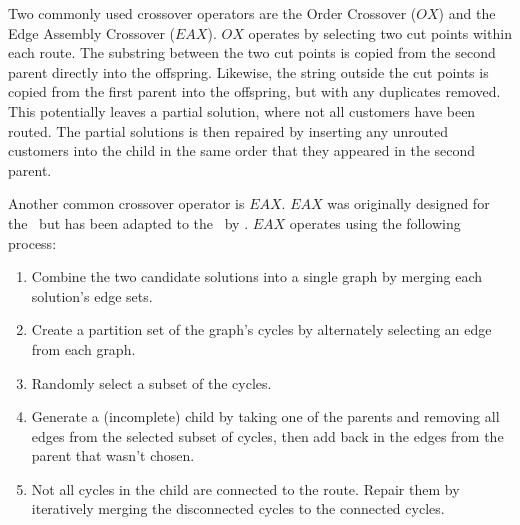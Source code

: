 Two commonly used crossover operators are the Order Crossover ($OX$) and the Edge Assembly Crossover ($EAX$). $OX$\cite{OSH:1987} operates by selecting two cut points within each route. The substring between the two cut points is copied from the second parent directly into the offspring. Likewise, the string outside the cut points is copied from the first parent into the offspring, but with any duplicates removed. This potentially leaves a partial solution, where not all customers have been routed. The partial solutions is then repaired by inserting any unrouted customers into the child in the same order that they appeared in the second parent.


Another common crossover operator is $EAX$. $EAX$ was originally designed for the \TSP\ but has been adapted to the \VRP\ by \cite{Nagata:2007}. $EAX$ operates using the following process:

\begin{enumerate}
    \item Combine the two candidate solutions into a single graph by merging each solution's edge sets.
    \item Create a partition set of the graph's cycles by alternately selecting an edge from each graph.
    \item Randomly select a subset of the cycles.
    \item Generate a (incomplete) child by taking one of the parents and removing all edges from the selected subset of cycles, then add back in the edges from the parent that wasn't chosen. 
    \item Not all cycles in the child are connected to the route. Repair them by iteratively merging the disconnected cycles to the connected cycles.
\end{enumerate}


